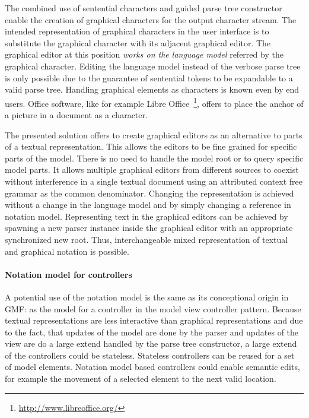 The combined use of sentential characters and guided parse tree constructor enable the creation of graphical characters for the output character stream. The intended representation of graphical characters in the user interface is to substitute the graphical character with its adjacent graphical editor. The graphical editor at this position \emph{works on the language model} referred by the graphical character. Editing the language model instead of the verbose parse tree is only possible due to the guarantee of sentential tokens to be expandable to a valid parse tree. Handling graphical elements as characters is known even by end users. Office software, like for example Libre Office~\footnote{\raggedright \url{http://www.libreoffice.org/}}, offers to place the anchor of a picture in a document as a character.

The presented solution offers to create graphical editors as an alternative to parts of a textual representation. This allows the editors to be fine grained for specific parts of the model. There is no need to handle the model root or to query specific model parts. It allows multiple graphical editors from different sources to coexist without interference in a single textual document using an attributed context free grammar as the common denominator. Changing the representation is achieved without a change in the language model and by simply changing a reference in notation model. Representing text in the graphical editors can be achieved by spawning a new parser instance inside the graphical editor with an appropriate synchronized new root. Thus, interchangeable mixed representation of textual and graphical notation is possible.

\paragraph{Notation model for controllers} A potential use of the notation model is the same as its conceptional origin in GMF: as the model for a controller in the model view controller pattern. Because textual representations are less interactive than graphical representations and due to the fact, that updates of the model are done by the parser and updates of the view are do a large extend handled by the parse tree constructor, a large extend of the controllers could be stateless. Stateless controllers can be reused for a set of model elements. Notation model based controllers could enable semantic edits, for example the movement of a selected element to the next valid location. 





